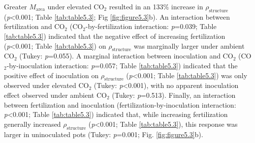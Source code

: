 Greater $M_\mathrm{area}$ under elevated CO$_2$ resulted in an 133\% increase in $\rho_\mathrm{structure}$ (\textit{p}<0.001; Table \ref{tab:table5.3}; Fig \ref{fig:figure5.3}b). An interaction between fertilization and CO$_2$ (CO$_2$-by-fertilization interaction: \textit{p}=0.039; Table \ref{tab:table5.3}) indicated that the negative effect of increasing fertilization (\textit{p}<0.001; Table \ref{tab:table5.3}) on $\rho_\mathrm{structure}$ was marginally larger under ambient CO$_2$ (Tukey: \textit{p}=0.055). A marginal interaction between inoculation and CO$_2$ (CO$_2$-by-inoculation interaction: \textit{p}=0.057; Table \ref{tab:table5.3}) indicated that the positive effect of inoculation on $\rho_\mathrm{structure}$ (\textit{p}<0.001; Table \ref{tab:table5.3}) was only observed under elevated CO$_2$ (Tukey: \textit{p}<0.001), with no apparent inoculation effect observed under ambient CO$_2$ (Tukey: \textit{p}=0.513). Finally, an interaction between fertilization and inoculation (fertilization-by-inoculation interaction: \textit{p}<0.001; Table \ref{tab:table5.3}) indicated that, while increasing fertilization generally increased $\rho_\mathrm{structure}$ (\textit{p}<0.001; Table \ref{tab:table5.3}), this response was larger in uninoculated pots (Tukey: \textit{p}=0.001; Fig. \ref{fig:figure5.3}b).

